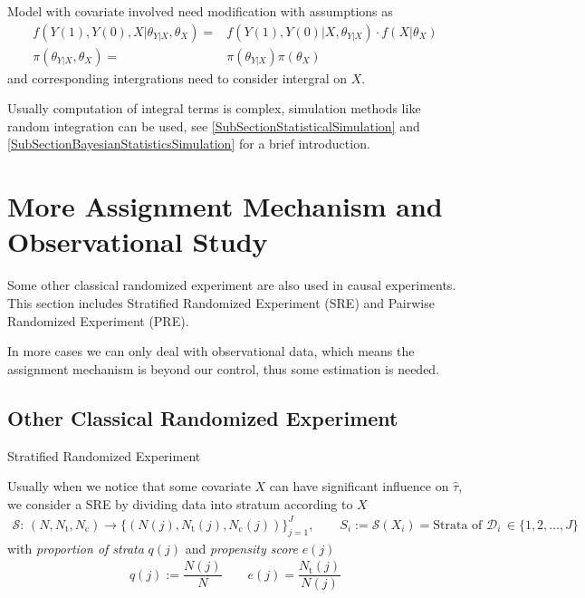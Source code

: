     Model with covariate involved need modification with assumptions as
    \begin{align}
        f\left(Y(1),Y(0),X|\theta _{Y|X},\theta _{X}\right) =& f\left(Y(1),Y(0)|X,\theta _{Y|X}\right) \cdot f\left(X|\theta _X\right)\\
        \pi(\theta _{Y|X},\theta _{X})=&\pi(\theta _{Y|X})\pi(\theta _X)
    \end{align}
    and corresponding intergrations need to consider intergral on $ X $.

    Usually computation of integral terms is complex, simulation methods like random integration can be used, see \autoref{SubSectionStatisticalSimulation} and \autoref{SubSectionBayesianStatisticsSimulation} for a brief introduction.
    


\section{More Assignment Mechanism and Observational Study}
Some other classical randomized experiment are also used in causal experiments. This section includes Stratified Randomized Experiment (SRE) and Pairwise Randomized Experiment (PRE).

In more cases we can only deal with observational data, which means the assignment mechanism is beyond our control, thus some estimation is needed.

\subsection{Other Classical Randomized Experiment}
\begin{point}
    Stratified Randomized Experiment
\end{point}

Usually when we notice that some covariate $ X $ can have significant influence on $ \hat{\tau} $, we consider a SRE by dividing data into stratum according to $ X $
\begin{align}
    \mathcal{S}:\,(N,N_\mathrm{t},N_\mathrm{c})\to \{\left(N(j),N_\mathrm{t}(j),N_\mathrm{c}(j)  \right)\}_{j=1}^J,\qquad S_i:=\mathcal{S}(X_i)=\text{Strata of }\mathcal{D}_i\,\in\{1,2,\ldots,J\}
\end{align}
with \textit{proportion of strata} $ q(j) $ and \textit{propensity score} $ e(j) $
\begin{align}
    q(j):=\dfrac{N(j)}{N}\qquad e(j)=\dfrac{N_\mathrm{t}(j) }{N(j)}
\end{align}

